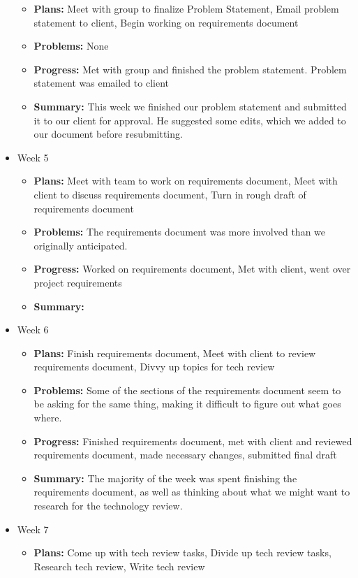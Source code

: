 \documentclass[onecolumn, draftclsnofoot,10pt, compsoc]{IEEEtran}
\begin{document}
\begin{itemize}
\begin{itemize}
	\item \textbf{Plans:} Meet with group to finalize Problem Statement, Email problem statement to client, Begin working on requirements document
    \item \textbf{Problems:} None
    \item \textbf{Progress:} Met with group and finished the problem statement. Problem statement was emailed to client
    \item \textbf{Summary:} This week we finished our problem statement and submitted it to our client for approval. He suggested some edits, which we added to our document before resubmitting.
	\end{itemize}
\item Week 5
	\begin{itemize}
	\item \textbf{Plans:} Meet with team to work on requirements document, Meet with client to discuss requirements document, Turn in rough draft of requirements document
    \item \textbf{Problems:} The requirements document was more involved than we originally anticipated.
    \item \textbf{Progress:} Worked on requirements document, Met with client, went over project requirements
    \item \textbf{Summary:} 
	\end{itemize}
\item Week 6
	\begin{itemize}
	\item \textbf{Plans:} Finish requirements document, Meet with client to review requirements document, Divvy up topics for tech review 
    \item \textbf{Problems:} Some of  the sections of the requirements document seem to be asking for the same thing, making it difficult to figure out what goes where.
    \item \textbf{Progress:} Finished requirements document, met with client and reviewed requirements document, made necessary changes, submitted final draft
    \item \textbf{Summary:} The majority of the week was spent finishing the requirements document, as well as thinking about what we might want to research for the technology review.
	\end{itemize}
\item Week 7
	\begin{itemize}
	\item \textbf{Plans:} Come up with tech review tasks, Divide up tech review tasks, Research tech review, Write tech review

\end{itemize}
\end{itemize}
\end{document}
